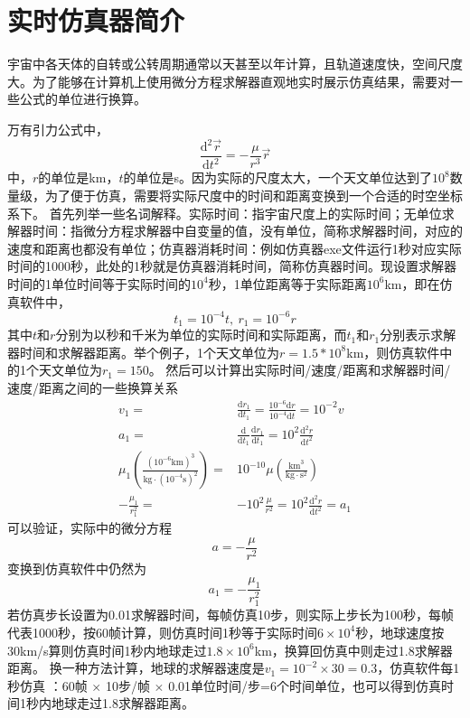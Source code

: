 \section{实时仿真器简介}
宇宙中各天体的自转或公转周期通常以天甚至以年计算，且轨道速度快，空间尺度大。为了能够在计算机上使用微分方程求解器\cite{olzhn2021}直观地实时展示仿真结果，需要对一些公式的单位进行换算。\par
万有引力公式中，
$$\frac{\text{d}^2\vec{r}}{\text{d}t^2}=-\frac{\mu}{r^3}\vec{r}$$
中，$r$的单位是km，$t$的单位是s。因为实际的尺度太大，一个天文单位达到了$10^8$数量级，为了便于仿真，需要将实际尺度中的时间和距离变换到一个合适的时空坐标系下。
首先列举一些名词解释。实际时间：指宇宙尺度上的实际时间；无单位求解器时间：指微分方程求解器中自变量的值，没有单位，简称求解器时间，对应的速度和距离也都没有单位；仿真器消耗时间：例如仿真器exe文件运行1秒对应实际时间的1000秒，此处的1秒就是仿真器消耗时间，简称仿真器时间。现设置求解器时间的1单位时间等于实际时间的$10^4$秒，1单位距离等于实际距离$10^6$km，即在仿真软件中，
$$t_1=10^{-4}t,\ r_1=10^{-6}r$$
其中$t$和$r$分别为以秒和千米为单位的实际时间和实际距离，而$t_1$和$r_1$分别表示求解器时间和求解器距离。举个例子，1个天文单位为$r=1.5*10^8$km，则仿真软件中的1个天文单位为$r_1=150$。
然后可以计算出实际时间/速度/距离和求解器时间/速度/距离之间的一些换算关系
$$\begin{aligned}
v_1 =& \frac{\text{d}r_1}{\text{d}t_1}
 = \frac{10^{-6}\text{d}r}{10^{-4}\text{d}t} = 10^{-2}v \\
a_1 =& \frac{\text{d}}{\text{d}t_1}\frac{\text{d}r_1}{\text{d}t_1}
 = 10^2\frac{\text{d}^2r}{\text{d}t^2} \\
\mu_1(\frac{(10^{-6}\text{km})^3}{\text{kg}\cdot(10^{-4}\text{s})^2})
 =& 10^{-10}\mu(\frac{\text{km}^3}{\text{kg}\cdot \text{s}^2}) \\
-\frac{\mu_1}{r_1^2} =& -10^2\frac{\mu}{r^2} = 10^2\frac{\text{d}^2r}{\text{d}t^2} = a_1
\end{aligned}$$
可以验证，实际中的微分方程
$$a=-\frac{\mu}{r^2}$$
变换到仿真软件中仍然为
$$a_1=-\frac{\mu_1}{r_1^2}$$
若仿真步长设置为0.01求解器时间，每帧仿真10步，则实际上步长为100秒，每帧代表1000秒，按60帧计算，则仿真时间1秒等于实际时间$6\times10^4$秒，地球速度按30km/s算则仿真时间1秒内地球走过$1.8\times10^6$km，换算回仿真中则走过1.8求解器距离。
换一种方法计算，地球的求解器速度是$v_1=10^{-2}\times30=0.3$，仿真软件每1秒仿真 ：60帧 $\times$ 10步/帧 $\times$ 0.01单位时间/步=6个时间单位，也可以得到仿真时间1秒内地球走过1.8求解器距离。

